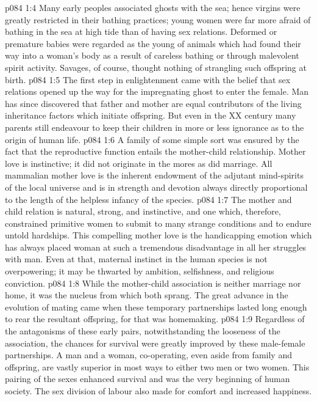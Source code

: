 \vs p084 1:4 Many early peoples associated ghosts with the sea; hence virgins were greatly restricted in their bathing practices; young women were far more afraid of bathing in the sea at high tide than of having sex relations. Deformed or premature babies were regarded as the young of animals which had found their way into a woman’s body as a result of careless bathing or through malevolent spirit activity. Savages, of course, thought nothing of strangling such offspring at birth.
\vs p084 1:5 The first step in enlightenment came with the belief that sex relations opened up the way for the impregnating ghost to enter the female. Man has since discovered that father and mother are equal contributors of the living inheritance factors which initiate offspring. But even in the XX century many parents still endeavour to keep their children in more or less ignorance as to the origin of human life.
\vs p084 1:6 \pc A family of some simple sort was ensured by the fact that the reproductive function entails the mother\hyp{}child relationship. Mother love is instinctive; it did not originate in the mores as did marriage. All mammalian mother love is the inherent endowment of the adjutant mind\hyp{}spirits of the local universe and is in strength and devotion always directly proportional to the length of the helpless infancy of the species.
\vs p084 1:7 The mother and child relation is natural, strong, and instinctive, and one which, therefore, constrained primitive women to submit to many strange conditions and to endure untold hardships. This compelling mother love is the handicapping emotion which has always placed woman at such a tremendous disadvantage in all her struggles with man. Even at that, maternal instinct in the human species is not overpowering; it may be thwarted by ambition, selfishness, and religious conviction.
\vs p084 1:8 While the mother\hyp{}child association is neither marriage nor home, it was the nucleus from which both sprang. The great advance in the evolution of mating came when these temporary partnerships lasted long enough to rear the resultant offspring, for that was homemaking.
\vs p084 1:9 Regardless of the antagonisms of these early pairs, notwithstanding the looseness of the association, the chances for survival were greatly improved by these male\hyp{}female partnerships. A man and a woman, co\hyp{}operating, even aside from family and offspring, are vastly superior in most ways to either two men or two women. This pairing of the sexes enhanced survival and was the very beginning of human society. The sex division of labour also made for comfort and increased happiness.
